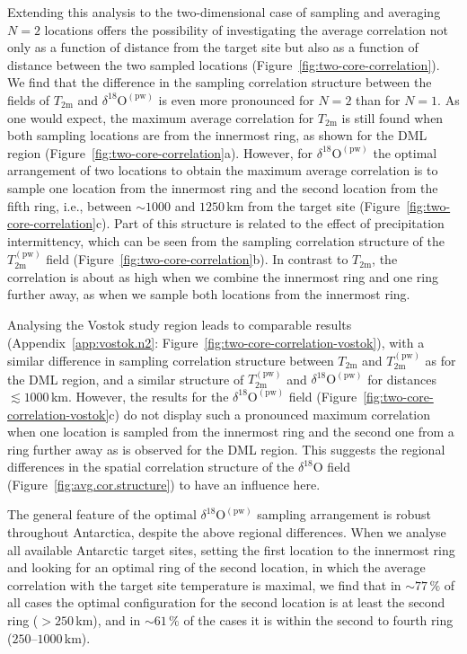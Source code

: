 \documentclass[draft]{agujournal2019}
\begin{document}
Extending this analysis to the two-dimensional case of sampling and averaging
$N=2$ locations offers the possibility of investigating the average correlation
not only as a function of distance from the target site but also as a function
of distance between the two sampled locations
(Figure~\ref{fig:two-core-correlation}). We find that the difference in the
sampling correlation structure between the fields of $T_{\mathrm{2m}}$ and
$\delta^{18}\mathrm{O}^{\mathrm{(pw)}}$ is even more pronounced for $N=2$ than
for $N=1$. As one would expect, the maximum average correlation for
$T_{\mathrm{2m}}$ is still found when both sampling locations are from the
innermost ring, as shown for the DML region
(Figure~\ref{fig:two-core-correlation}a). However, for
$\delta^{18}\mathrm{O}^{\mathrm{(pw)}}$ the optimal arrangement of two locations
to obtain the maximum average correlation is to sample one location from the
innermost ring and the second location from the fifth ring, i.e., between
$\sim1000$ and $1250$\,km from the target site
(Figure~\ref{fig:two-core-correlation}c). Part of this structure is related to the
effect of precipitation intermittency, which can be seen from the sampling
correlation structure of the $T_{\mathrm{2m}}^{\mathrm{(pw)}}$ field
(Figure~\ref{fig:two-core-correlation}b). In contrast to $T_{\mathrm{2m}}$, the
correlation is about as high when we combine the innermost ring and one ring
further away, as when we sample both locations from the innermost ring.

Analysing the Vostok study region leads to comparable results
(Appendix~\ref{app:vostok.n2}: Figure~\ref{fig:two-core-correlation-vostok}), with
a similar difference in sampling correlation structure between $T_{\mathrm{2m}}$
and $T_{\mathrm{2m}}^{\mathrm{(pw)}}$ as for the DML region, and a similar
structure of $T_{\mathrm{2m}}^{\mathrm{(pw)}}$ and
$\delta^{18}\mathrm{O}^{\mathrm{(pw)}}$ for distances $\lesssim1000$\,km.
However, the results for the $\delta^{18}\mathrm{O}^{\mathrm{(pw)}}$ field
(Figure~\ref{fig:two-core-correlation-vostok}c) do not display such a pronounced
maximum correlation when one location is sampled from the innermost ring and the
second one from a ring further away as is observed for the DML region. This
suggests the regional differences in the spatial correlation structure of the
$\delta^{18}\mathrm{O}$ field (Figure~\ref{fig:avg.cor.structure}) to have an
influence here.

The general feature of the optimal $\delta^{18}\mathrm{O}^{\mathrm{(pw)}}$
sampling arrangement is robust throughout Antarctica, despite the above regional
differences. When we analyse all available Antarctic target sites, setting the
first location to the innermost ring and looking for an optimal ring of the
second location, in which the average correlation with the target site
temperature is maximal, we find that in $\sim77\,\%$ of all cases the optimal
configuration for the second location is at least the second ring ($>250$\,km),
and in $\sim61\,\%$ of the cases it is within the second to fourth ring
($250$--$1000$\,km).
\end{document}
